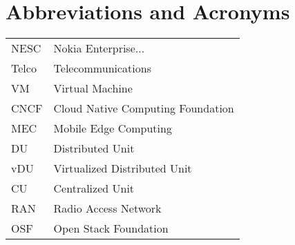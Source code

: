 \chapter*{Abbreviations and Acronyms}


\noindent
\begin{longtable}{@{}p{}p{}@{}}
NESC & Nokia Enterprise... \\
Telco & Telecommunications \\
VM & Virtual Machine \\
CNCF & Cloud Native Computing Foundation \\
MEC & Mobile Edge Computing \\
DU & Distributed Unit \\
vDU & Virtualized Distributed Unit \\
CU & Centralized Unit \\
RAN & Radio Access Network \\
OSF & Open Stack Foundation \\



\end{longtable}

